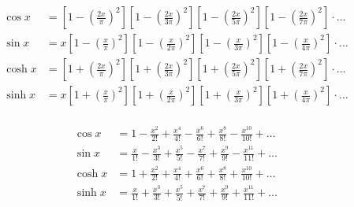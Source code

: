 \begin{equation*}
\begin{aligned}
\cos{x} &= 
\left[1 - \left(\frac{2 x}{\pi} \right)^2 \right] 
\left[1 - \left(\frac{2 x}{3 \pi} \right)^2 \right]
\left[1 - \left(\frac{2 x}{5 \pi} \right)^2 \right] 
\left[1 - \left(\frac{2 x}{7 \pi} \right)^2 \right] 
\cdot \ldots \\
%
\sin{x} &= x 
\left[1 - \left(\frac{x}{\pi} \right)^2 \right] 
\left[1 - \left(\frac{x}{2 \pi} \right)^2 \right]
\left[1 - \left(\frac{x}{3 \pi} \right)^2 \right] 
\left[1 - \left(\frac{x}{4 \pi} \right)^2 \right] 
\cdot \ldots \\
%
\cosh{x} &= 
\left[1 + \left(\frac{2 x}{\pi} \right)^2 \right] 
\left[1 + \left(\frac{2 x}{3 \pi} \right)^2 \right]
\left[1 + \left(\frac{2 x}{5 \pi} \right)^2 \right] 
\left[1 + \left(\frac{2 x}{7 \pi} \right)^2 \right] 
\cdot \ldots \\
%
\sinh{x} &= x 
\left[1 + \left(\frac{x}{\pi} \right)^2 \right] 
\left[1 + \left(\frac{x}{2 \pi} \right)^2 \right]
\left[1 + \left(\frac{x}{3 \pi} \right)^2 \right] 
\left[1 + \left(\frac{x}{4 \pi} \right)^2 \right] 
\cdot \ldots \\
\end{aligned}
\end{equation*}

\begin{equation*}
\begin{aligned}
\cos{x} 
&= 1 
- \frac{x^2}{2!} 
+ \frac{x^4}{4!} 
- \frac{x^6}{6!} 
+ \frac{x^8}{8!} 
- \frac{x^{10}}{10!} 
+ \ldots \\
\sin{x} 
&= \frac{x}{1!} 
- \frac{x^3}{3!} 
+ \frac{x^5}{5!} 
- \frac{x^7}{7!} 
+ \frac{x^9}{9!} 
- \frac{x^{11}}{11!} 
+ \ldots \\
\cosh{x} 
&= 1 
+ \frac{x^2}{2!} 
+ \frac{x^4}{4!} 
+ \frac{x^6}{6!} 
+ \frac{x^8}{8!} 
+ \frac{x^{10}}{10!} 
+ \ldots \\
\sinh{x} 
&= \frac{x}{1!} 
+ \frac{x^3}{3!} 
+ \frac{x^5}{5!} 
+ \frac{x^7}{7!} 
+ \frac{x^9}{9!} 
+ \frac{x^{11}}{11!} 
+ \ldots \\
\end{aligned}
\end{equation*}

